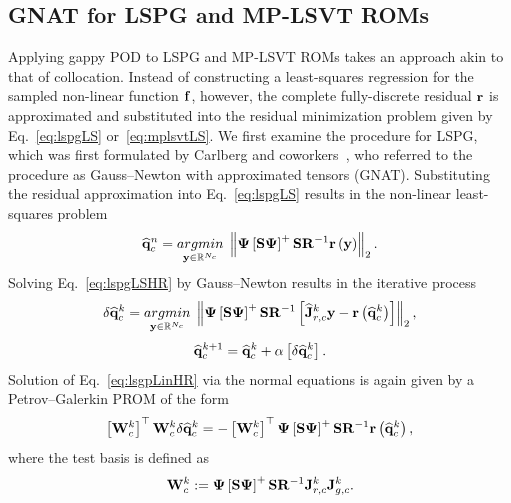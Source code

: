 \subsection{GNAT for LSPG and MP-LSVT ROMs}
%
Applying gappy POD to LSPG and MP-LSVT ROMs takes an approach akin to that of collocation. Instead of constructing a least-squares regression for the sampled non-linear function $\mathbf{f}$, however, the complete fully-discrete residual $\mathbf{r}$ is approximated and substituted into the residual minimization problem given by Eq.~\ref{eq:lspgLS} or~\ref{eq:mplsvtLS}. We first examine the procedure for LSPG, which was first formulated by Carlberg and coworkers~\cite{Carlberg2010,Carlberg2013}, who referred to the procedure as Gauss--Newton with approximated tensors (GNAT). Substituting the residual approximation into Eq.~\ref{eq:lspgLS} results in the non-linear least-squares problem
%
\begin{equation}\label{eq:lspgLSHR}
    \consVecCoef^{\timeIdx} = \argmin{\dummyVec \inROne{\numConsModes}} \left\Vert \deimBasis \left[ \sampMat \deimBasis \right]^{+} \sampMat \resScaleInv \resFunc{\dummyVec} \right\Vert_2.
\end{equation}
%
Solving Eq.~\ref{eq:lspgLSHR} by Gauss--Newton results in the iterative process
%
\begin{equation}\label{eq:lsgpLinHR}
    \delta \consVecCoef^{\newtonIdx} = \argmin{\dummyVec \inROne{\numConsModes}} \left\Vert \deimBasis \left[ \sampMat \deimBasis \right]^{+} \sampMat \resScaleInv \left[ \jacobResCoefCons^{\newtonIdx} \dummyVec - \resFunc{\consVecCoef^{\newtonIdx}}\right] \right\Vert_2,
\end{equation}
\begin{equation}
    \mathbf{\widehat{q}}_{c}^{k + 1} = \mathbf{\widehat{q}}_{c}^{k} + \alpha \left[ \delta \mathbf{\widehat{q}}_{c}^{k} \right].
\end{equation}
%
Solution of Eq.~\ref{eq:lsgpLinHR} via the normal equations is again given by a Petrov--Galerkin PROM of the form
%
\begin{equation}\label{eq:lspgHRSolve}
    \left[ \testBasisCons^\newtonIdx \right]^\top \testBasisCons^\newtonIdx \delta \consVecCoef^{\newtonIdx} = -\left[\testBasisCons^\newtonIdx \right]^\top \deimBasis \left[ \sampMat \deimBasis \right]^{+} \sampMat \resScaleInv \resFunc{\consVecCoef^{\newtonIdx}},
\end{equation}
%
where the test basis is defined as
%
\begin{equation}\label{eq:lspgHRTest}
    \testBasisCons^\newtonIdx \defEq \deimBasis \left[ \sampMat \deimBasis \right]^{+} \sampMat \resScaleInv \jacobResCons^{\newtonIdx} \jacobDecodeCons^{\newtonIdx}.
\end{equation}
